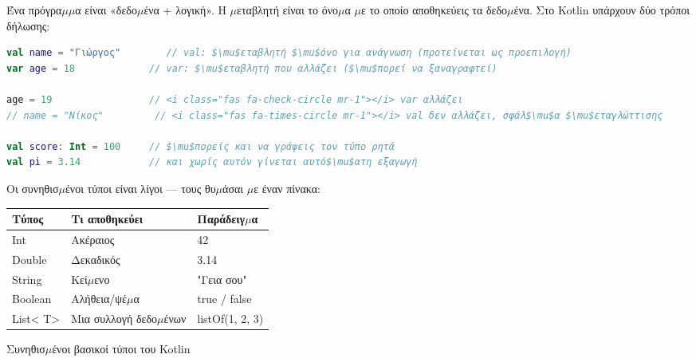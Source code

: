 


Ένα πρόγρα$\mu$$\mu$α είναι «δεδο$\mu$ένα + λογική». Η $\mu$εταβλητή είναι το όνο$\mu$α $\mu$ε το οποίο αποθηκεύεις τα δεδο$\mu$ένα. Στο Kotlin υπάρχουν δύο τρόποι δήλωσης:

\begin{lstlisting}[language=Kotlin]
val name = "Γιώργος"        // val: $\mu$εταβλητή $\mu$όνο για ανάγνωση (προτείνεται ως προεπιλογή)
var age = 18             // var: $\mu$εταβλητή που αλλάζει ($\mu$πορεί να ξαναγραφτεί)

age = 19                 // <i class="fas fa-check-circle mr-1"></i> var αλλάζει
// name = "Νίκος"         // <i class="fas fa-times-circle mr-1"></i> val δεν αλλάζει, σφάλ$\mu$α $\mu$εταγλώττισης

val score: Int = 100     // $\mu$πορείς και να γράψεις τον τύπο ρητά
val pi = 3.14            // και χωρίς αυτόν γίνεται αυτό$\mu$ατη εξαγωγή
\end{lstlisting}

Οι συνηθισ$\mu$ένοι τύποι είναι λίγοι — τους θυ$\mu$άσαι $\mu$ε έναν πίνακα:

\begin{center}
\begin{tabularx}{\linewidth}{|X|X|X|}
\hline
\textbf{Τύπος} & \textbf{Τι αποθηκεύει} & \textbf{Παράδειγ$\mu$α} \tabularnewline
\hline
Int & Ακέραιος & 42 \tabularnewline
Double & Δεκαδικός & 3.14 \tabularnewline
String & Κεί$\mu$ενο & "Γεια σου" \tabularnewline
Boolean & Αλήθεια/ψέ$\mu$α & true / false \tabularnewline
List< T> & Μια συλλογή δεδο$\mu$ένων & listOf(1, 2, 3) \tabularnewline
\hline
\end{tabularx}
\end{center}

\begin{center}\small\color{gray}Συνηθισ$\mu$ένοι βασικοί τύποι του Kotlin\end{center}


